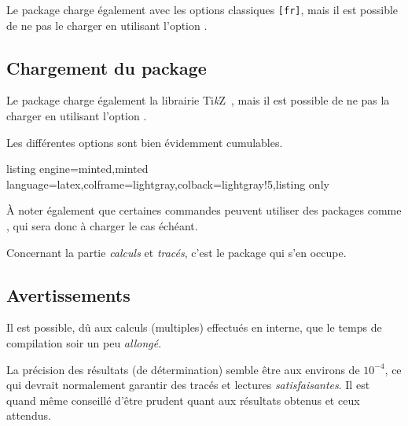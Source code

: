 \documentclass[11pt,a4paper]{ltxdoc}
\providecommand\tikzlogo{Ti\textit{k}Z}
\let\TikZ\tikzlogo
\begin{document}
\smallskip

Le package charge également  avec les options classiques \texttt{[fr]}, mais il est possible de ne pas le charger en utilisant l'option \MontreCode{[nonsiunitx]}.

\pagebreak

\subsection{Chargement du package}

Le package charge également la librairie \TikZ\ , mais il est possible de ne pas la charger en utilisant l'option \MontreCode{[nontikzbabel]}.

\smallskip

Les différentes options sont bien évidemment cumulables.

\begin{tcblisting}{listing engine=minted,minted language=latex,colframe=lightgray,colback=lightgray!5,listing only}
\usepackage{tkz-grapheur}

\usepackage[nonsiunitx]{tkz-grapheur}

\usepackage[nontikzbabel]{tkz-grapheur}

\usepackage[nonpgfplots]{tkz-grapheur}
\pgfplotsset{compat=...}
\end{tcblisting}

À noter également que certaines commandes peuvent utiliser des packages comme , qui sera donc à charger le cas échéant.

\smallskip

Concernant la partie \textit{calculs} et \textit{tracés}, c'est le package  qui s'en occupe.

\subsection{Avertissements}

Il est possible, dû aux calculs (multiples) effectués en interne, que le temps de compilation soir un peu \textit{allongé}.

\smallskip

La précision des résultats (de détermination) semble être aux environs de $10^{-4}$, ce qui devrait normalement garantir des tracés et lectures \textit{satisfaisantes}. Il est quand même conseillé d'être prudent quant aux résultats obtenus et ceux attendus.
\end{document}
